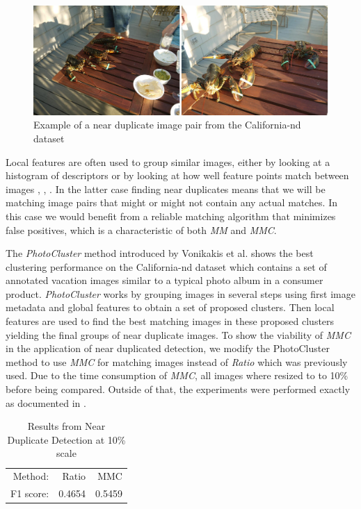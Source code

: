 \begin{figure}[h]
	\includegraphics[width=\textwidth]{images/near_duplicate_example}
	\caption{Example of a near duplicate image pair from the 
	California-nd dataset \cite{jinda2012california}}
	\label{fig:near_duplicate}
\end{figure}

Local features are often used to group similar images, either by looking
at a histogram of descriptors \cite{wu2009bundling} or by looking at how
well feature points match between images \cite{zhao2009scale},
\cite{chu2010consumer}, \cite{vas2013cluster}. In the latter case 
finding near duplicates means that we will be matching image pairs that 
might or might not contain any actual matches. In this case we would 
benefit from a reliable matching algorithm that minimizes false 
positives, which is a characteristic of both \emph{MM} and \emph{MMC}.

The \emph{PhotoCluster} method introduced by Vonikakis et al.  
\cite{vas2013cluster} shows the best clustering performance on the 
California-nd dataset \cite{jinda2012california} which contains a set of
annotated vacation images similar to a typical photo album in a consumer
product. \emph{PhotoCluster} works by grouping images in several steps 
using first image metadata and global features to obtain a set of 
proposed clusters. Then local features are used to find the best 
matching images in these proposed clusters yielding the final groups of 
near duplicate images. To show the viability of \emph{MMC} in the 
application of near duplicated detection, we modify the PhotoCluster 
method to use \emph{MMC} for matching images instead of \emph{Ratio} 
which was previously used. Due to the time consumption of \emph{MMC}, 
all images where resized to to 10\% before being compared. Outside of 
that, the experiments were performed exactly as documented in 
\cite{vas2013cluster}.

\begin{table}[htb]
\caption{Results from Near Duplicate Detection at 10\% scale}
\label{table:ndd}
	\centering
\begin{tabular}{r*{2}{r}}
\hline
    Method: & Ratio & MMC   \\
	\noalign{\smallskip}
    F1 score: & 0.4654 & 0.5459 \\
	\hline
\end{tabular}
\end{table}

